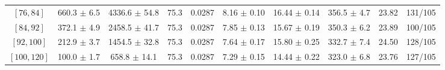 \begin{tabular}{c||c|c|c|c|c|c|c||c|c}
$[76, 84]$ & 660.3 $\pm$ 6.5 & 4336.6 $\pm$ 54.8 & 75.3 & 0.0287 & 8.16 $\pm$ 0.10 & 16.44 $\pm$ 0.14 & 356.5 $\pm$ 4.7 & 23.82 & 131/105\\
$[84, 92]$ & 372.1 $\pm$ 4.9 & 2458.5 $\pm$ 41.7 & 75.3 & 0.0287 & 7.85 $\pm$ 0.13 & 15.67 $\pm$ 0.19 & 350.3 $\pm$ 6.2 & 23.89 & 100/105\\
$[92, 100]$ & 212.9 $\pm$ 3.7 & 1454.5 $\pm$ 32.8 & 75.3 & 0.0287 & 7.64 $\pm$ 0.17 & 15.80 $\pm$ 0.25 & 332.7 $\pm$ 7.4 & 24.50 & 128/105\\
$[100, 120]$ & 100.0 $\pm$ 1.7 & 658.8 $\pm$ 14.1 & 75.3 & 0.0287 & 7.29 $\pm$ 0.15 & 14.44 $\pm$ 0.22 & 323.0 $\pm$ 6.8 & 23.76 & 127/105\\
\end{tabular}
